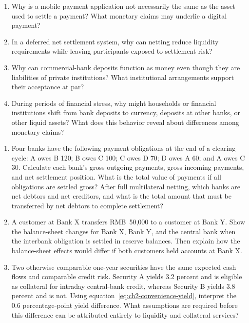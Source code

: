 \begin{enumerate}

\item Why is a mobile payment application not necessarily the same as the asset used to settle a payment? What monetary claims may underlie a digital payment?

\item In a deferred net settlement system, why can netting reduce liquidity requirements while leaving participants exposed to settlement risk?

\item Why can commercial-bank deposits function as money even though they are liabilities of private institutions? What institutional arrangements support their acceptance at par?

\item During periods of financial stress, why might households or financial institutions shift from bank deposits to currency, deposits at other banks, or other liquid assets? What does this behavior reveal about differences among monetary claims?

\end{enumerate}



\begin{enumerate}

\item Four banks have the following payment obligations at the end of a clearing cycle: A owes B 120; B owes C 100; C owes D 70; D owes A 60; and A owes C 30. Calculate each bank's gross outgoing payments, gross incoming payments, and net settlement position. What is the total value of payments if all obligations are settled gross? After full multilateral netting, which banks are net debtors and net creditors, and what is the total amount that must be transferred by net debtors to complete settlement?

\item A customer at Bank X transfers RMB~50,000 to a customer at Bank Y. Show the balance-sheet changes for Bank X, Bank Y, and the central bank when the interbank obligation is settled in reserve balances. Then explain how the balance-sheet effects would differ if both customers held accounts at Bank X.

\item Two otherwise comparable one-year securities have the same expected cash flows and comparable credit risk. Security A yields 3.2 percent and is eligible as collateral for intraday central-bank credit, whereas Security B yields 3.8 percent and is not. Using equation~\eqref{eq:ch2-convenience-yield}, interpret the 0.6 percentage-point yield difference. What assumptions are required before this difference can be attributed entirely to liquidity and collateral services?

\end{enumerate}

